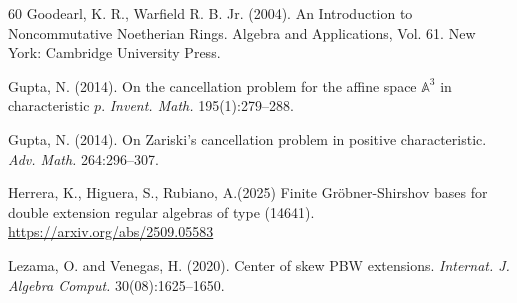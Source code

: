 \documentclass{amsart}
\theoremstyle{definition}
\theoremstyle{remark}
\numberwithin{equation}{section}
\begin{document}
\begin{thebibliography}{60}
 Goodearl, K. R., Warfield R. B. Jr. (2004). An Introduction to Noncommutative Noetherian Rings. Algebra and Applications, Vol. 61. New York: Cambridge University Press.


 Gupta, N. (2014). On the cancellation problem for the affine space $\mathbb{A}^3$ in characteristic $p$. {\em Invent. Math.} 195(1):279--288.

 Gupta, N. (2014). On Zariski's cancellation problem in positive characteristic. {\em Adv. Math.} 264:296--307.


 Herrera, K., Higuera, S., Rubiano, A.(2025) Finite Gr\"obner-Shirshov bases for double extension regular algebras of type (14641). \url{https://arxiv.org/abs/2509.05583}








 Lezama, O. and Venegas, H. (2020). Center of skew PBW extensions. {\em Internat. J. Algebra Comput.} 30(08):1625--1650.


\end{thebibliography}
\end{document}
